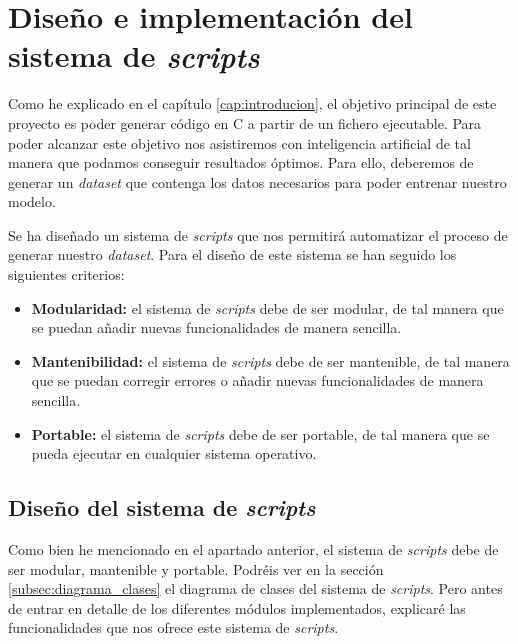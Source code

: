 \chapter{Diseño e implementación del sistema de \textit{scripts}}
\label{cap:diseñoImplentacion_scripts}


Como he explicado en el capítulo \ref{cap:introducion}, el objetivo principal de este
proyecto es poder generar código en C a partir de un fichero ejecutable. Para poder
alcanzar este objetivo nos asistiremos con inteligencia artificial de tal manera que
podamos conseguir resultados óptimos. Para ello, deberemos de generar un \textit{dataset}
que contenga los datos necesarios para poder entrenar nuestro modelo.

Se ha diseñado un sistema de \textit{scripts} que nos permitirá automatizar el proceso
de generar nuestro \textit{dataset}. Para el diseño de este sistema se han seguido los
siguientes criterios:

\begin{itemize}
    \item \textbf{Modularidad:} el sistema de \textit{scripts} debe de ser modular, de tal manera
        que se puedan añadir nuevas funcionalidades de manera sencilla.
    \item \textbf{Mantenibilidad:} el sistema de \textit{scripts} debe de ser mantenible, de tal
        manera que se puedan corregir errores o añadir nuevas funcionalidades de manera
        sencilla.
    \item \textbf{Portable:} el sistema de \textit{scripts} debe de ser portable, de tal manera
        que se pueda ejecutar en cualquier sistema operativo.
\end{itemize}

\section{Diseño del sistema de \textit{scripts}}
\label{sec:diseño_sistema_scripts}


Como bien he mencionado en el apartado anterior, el sistema de \textit{scripts} debe de ser
modular, mantenible y portable. Podréis ver en la sección \ref{subsec:diagrama_clases}
el diagrama de clases del sistema de \textit{scripts}. Pero antes de entrar en detalle de
los diferentes módulos implementados, explicaré las funcionalidades que nos ofrece
este sistema de \textit{scripts}.

